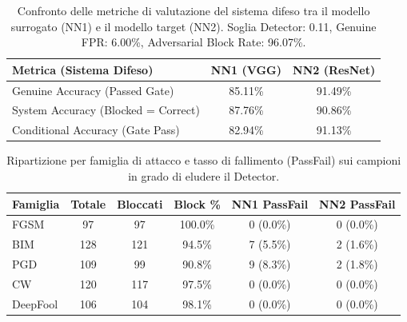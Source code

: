 \documentclass[a4paper, 12pt]{article}
\begin{document}
\begin{table}[htbp]
    \centering
    \caption{Confronto delle metriche di valutazione del sistema difeso tra il modello surrogato (NN1) e il modello target (NN2). Soglia Detector: 0.11, Genuine FPR: 6.00\%, Adversarial Block Rate: 96.07\%.}
    \label{tab:transferability_metrics}
    \begin{tabular}{@{}lcc@{}}
        \toprule
        \textbf{Metrica (Sistema Difeso)} & \textbf{NN1 (VGG)} & \textbf{NN2 (ResNet)} \\
        \midrule
        Genuine Accuracy (Passed Gate) & 85.11\% & 91.49\% \\
        System Accuracy (Blocked = Correct) & 87.76\% & 90.86\% \\
        Conditional Accuracy (Gate Pass) & 82.94\% & 91.13\% \\
        \bottomrule
    \end{tabular}
\end{table}

\begin{table}[htbp]
    \centering
    \caption{Ripartizione per famiglia di attacco e tasso di fallimento (PassFail) sui campioni in grado di eludere il Detector.}
    \label{tab:transferability_breakdown}
    \begin{tabular}{@{}lccccc@{}}
        \toprule
        \textbf{Famiglia} & \textbf{Totale} & \textbf{Bloccati} & \textbf{Block \%} & \textbf{NN1 PassFail} & \textbf{NN2 PassFail} \\
        \midrule
        FGSM & 97 & 97 & 100.0\% & 0 (0.0\%) & 0 (0.0\%) \\
        BIM & 128 & 121 & 94.5\% & 7 (5.5\%) & 2 (1.6\%) \\
        PGD & 109 & 99 & 90.8\% & 9 (8.3\%) & 2 (1.8\%) \\
        CW & 120 & 117 & 97.5\% & 0 (0.0\%) & 0 (0.0\%) \\
        DeepFool & 106 & 104 & 98.1\% & 0 (0.0\%) & 0 (0.0\%) \\
        \bottomrule
    \end{tabular}
\end{table}
\end{document}
